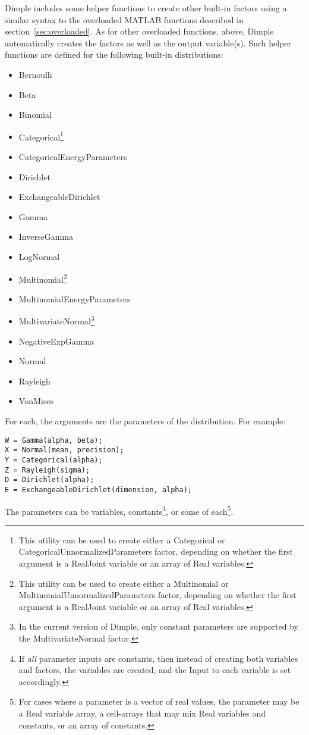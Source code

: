 Dimple includes some helper functions to create other built-in factors using a similar syntax to the overloaded MATLAB functions described in section~\ref{sec:overloaded}.  As for other overloaded functions, above, Dimple automatically creates the factors as well as the output variable(s).  Such helper functions are defined for the following built-in distributions:

\begin{itemize}
\item Bernoulli
\item Beta
\item Binomial
\item Categorical\footnote{This utility can be used to create either a Categorical or CategoricalUnnormalizedParameters factor, depending on whether the first argument is a RealJoint variable or an array of Real variables.}
\item CategoricalEnergyParameters
\item Dirichlet
\item ExchangeableDirichlet
\item Gamma
\item InverseGamma
\item LogNormal
\item Multinomial\footnote{This utility can be used to create either a Multinomial or MultinomialUnnormalizedParameters factor, depending on whether the first argument is a RealJoint variable or an array of Real variables.}
\item MultinomialEnergyParameters
\item MultivariateNormal\footnote{In the current version of Dimple, only constant parameters are supported by the MultivariateNormal factor.}
\item NegativeExpGamma
\item Normal
\item Rayleigh
\item VonMises
\end{itemize}

For each, the arguments are the parameters of the distribution.  For example:

\begin{lstlisting}
W = Gamma(alpha, beta);
X = Normal(mean, precision);
Y = Categorical(alpha);
Z = Rayleigh(sigma);
D = Dirichlet(alpha);
E = ExchangeableDirichlet(dimension, alpha);
\end{lstlisting}


The parameters can be variables, constants\footnote{If \emph{all} parameter inputs are constants, then instead of creating both variables and factors, the variables are created, and the Input to each variable is set accordingly.}, or some of each\footnote{For cases where a parameter is a vector of real values, the parameter may be a Real variable array, a cell-arrays that may mix Real variables and constants, or an array of constants.}.

